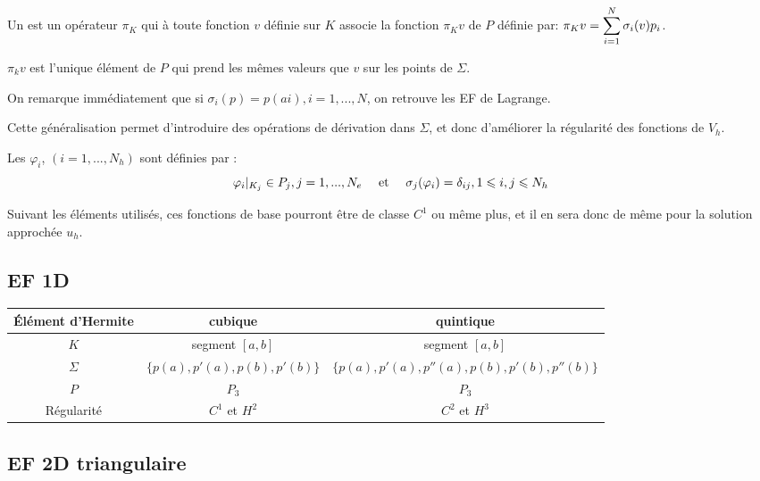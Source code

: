 \medskip
\begin{definition}
Un  est un opérateur $\pi_K$
qui à toute fonction $v$ définie sur $K$ associe la fonction $\pi_Kv$ de $P$ définie par:
$\colorred\pi_Kv=\dsum_{i=1}^N \sigma_i(v)p_i$.
\end{definition}

\medskip
$\pi_kv$ est l'unique élément de $P$ qui prend les mêmes valeurs que $v$ sur les
points de $\Sigma$.

\medskip
On remarque immédiatement que si $\sigma_i(p) = p(ai), i=1, ..., N$, on retrouve les EF
de Lagrange.

Cette généralisation permet d'introduire des opérations de dérivation dans $\Sigma$,
et donc d'améliorer la régularité des fonctions de $V_h$.

\medskip
Les  $\varphi_i$, $(i=1, ..., N_h)$ sont 
définies par :
\begin{equation}
\varphi_i|_{K_j} \in P_j, j=1, ..., N_e \quad \text{ et } \quad \colorred
\sigma_j(\varphi_i)=\delta_{ij}, 1\le i,j\le N_h
\end{equation}

Suivant les éléments utilisés, ces fonctions de base pourront être de classe $C^1$
ou même plus, et il en sera donc de même pour la solution approchée $u_h$.


\medskip
\subsection*{EF 1D}

\begin{center}
\begin{tabular}{c|cc}
Élément d'Hermite & cubique & quintique\\
\hline
$K$	      & segment $[a,b]$ &  segment $[a,b]$\\
$\Sigma$   & $\{p(a), p'(a), p(b), p'(b)\}$ & $\{p(a), p'(a), p''(a), p(b), p'(b), p''(b)\}$\\
$P$            & $P_3$ & $P_3$\\
Régularité & $C^1$ et $H^2$ & $C^2$ et $H^3$\\
\hline
\end{tabular}
\end{center}

\medskip
\subsection*{EF 2D triangulaire}

